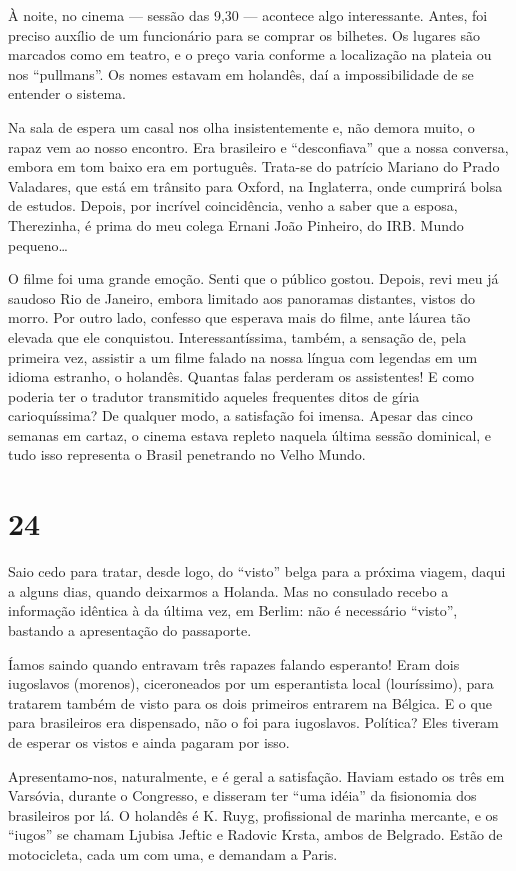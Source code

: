 À noite, no cinema --- sessão das 9,30 --- acontece algo interessante. Antes, foi preciso auxílio de um funcionário para se comprar os bilhetes. Os lugares são marcados como em teatro, e o preço varia conforme a localização na plateia ou nos ``pullmans''. Os nomes estavam em holandês, daí a impossibilidade de se entender o sistema.

Na sala de espera um casal nos olha insistentemente e, não demora muito, o rapaz vem ao nosso encontro. Era brasileiro e ``desconfiava'' que a nossa conversa, embora em tom baixo era em português. Trata-se do patrício Mariano do Prado Valadares, que está em trânsito para Oxford, na Inglaterra, onde cumprirá bolsa de estudos. Depois, por incrível coincidência, venho a saber que a esposa, Therezinha, é prima do meu colega Ernani João Pinheiro, do IRB. Mundo pequeno\ldots

O filme foi uma grande emoção. Senti que o público gostou. Depois, revi meu já saudoso Rio de Janeiro, embora limitado aos panoramas distantes, vistos do morro. Por outro lado, confesso que esperava mais do filme, ante láurea tão elevada que ele conquistou. Interessantíssima, também, a sensação de, pela primeira vez, assistir a um filme falado na nossa língua com legendas em um idioma estranho, o holandês. Quantas falas perderam os assistentes! E como poderia ter o tradutor transmitido aqueles frequentes ditos de gíria carioquíssima? De qualquer modo, a satisfação foi imensa. Apesar das cinco semanas em cartaz, o cinema estava repleto naquela última sessão dominical, e tudo isso representa o Brasil penetrando no Velho Mundo.

\section*{24 \adfflatleafright {}}
Saio cedo para tratar, desde logo, do ``visto'' belga para a próxima viagem, daqui a alguns dias, quando deixarmos a Holanda. Mas no consulado recebo a informação idêntica à da última vez, em Berlim: não é necessário ``visto'', bastando a apresentação do passaporte.

Íamos saindo quando entravam três rapazes falando esperanto! Eram dois iugoslavos (morenos), ciceroneados por um esperantista local (louríssimo), para tratarem também de visto para os dois primeiros entrarem na Bélgica. E o que para brasileiros era dispensado, não o foi para iugoslavos. Política? Eles tiveram de esperar os vistos e ainda pagaram por isso.

Apresentamo-nos, naturalmente, e é geral a satisfação. Haviam estado os três em Varsóvia, durante o Congresso, e disseram ter ``uma idéia'' da fisionomia dos brasileiros por lá. O holandês é K. Ruyg, profissional de marinha mercante, e os ``iugos'' se chamam Ljubisa Jeftic e Radovic Krsta, ambos de Belgrado. Estão de motocicleta, cada um com uma, e demandam a Paris.

